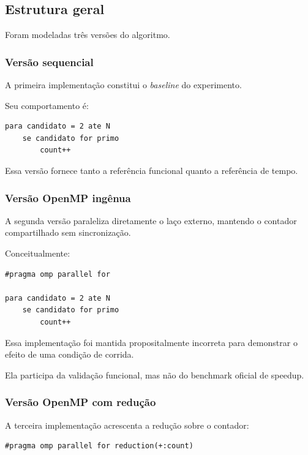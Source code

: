 \subsection{Estrutura geral}

Foram modeladas três versões do algoritmo.

\subsubsection{Versão sequencial}

A primeira implementação constitui o \textit{baseline} do experimento.

Seu comportamento é:

\begin{verbatim}
para candidato = 2 ate N
    se candidato for primo
        count++
\end{verbatim}

Essa versão fornece tanto a referência funcional quanto a referência de
tempo.


\subsubsection{Versão OpenMP ingênua}

A segunda versão paraleliza diretamente o laço externo, mantendo o contador
compartilhado sem sincronização.

Conceitualmente:

\begin{verbatim}
#pragma omp parallel for

para candidato = 2 ate N
    se candidato for primo
        count++
\end{verbatim}

Essa implementação foi mantida propositalmente incorreta para demonstrar o
efeito de uma condição de corrida.

Ela participa da validação funcional, mas não do benchmark oficial de
speedup.


\subsubsection{Versão OpenMP com redução}

A terceira implementação acrescenta a redução sobre o contador:

\begin{verbatim}
#pragma omp parallel for reduction(+:count)
\end{verbatim}

